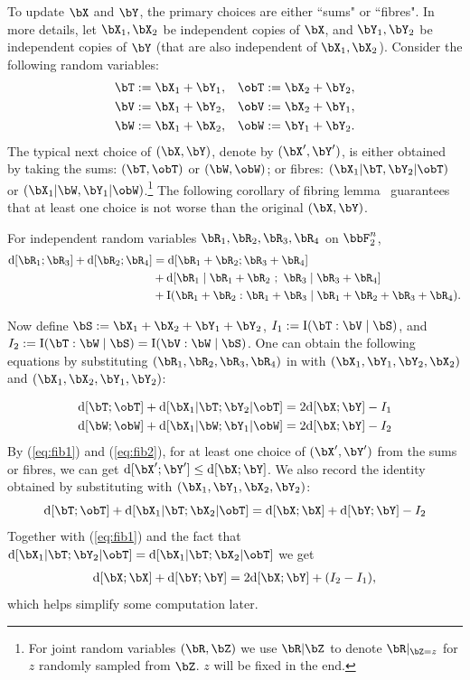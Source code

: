 \documentclass{article}
\DeclarePairedDelimiter{\paren}{(}{)}
\DeclarePairedDelimiter{\sqpar}{[}{]}
\newcommand{\info}{\mathrm{I}\paren}
\newcommand{\Ruz}{\mathrm{d}\sqpar}
\begin{document}
To update $\bX$ and $\bY$, the primary choices are either ``sums" or ``fibres". In more details, let $\bX_1,\bX_2$ be independent copies of $\bX$, and $\bY_1,\bY_2$ be independent copies of $\bY$ (that are also independent of $\bX_1,\bX_2$). Consider the following random variables:
\begin{align*}
\bT&:=\bX_1+\bY_1, & \obT&:=\bX_2+\bY_2,\\
\bV&:=\bX_1+\bY_2, & \obV&:=\bX_2+\bY_1,\\
\bW&:=\bX_1+\bX_2, & \obW&:=\bY_1+\bY_2.\\
\end{align*}
The typical next choice of $(\bX,\bY)$, denote by $(\bX',\bY')$, is either obtained by taking the sums: $(\bT,\obT)$ or $(\bW,\obW)$; or fibres: $(\bX_1|\bT, \bY_2|\obT)$ or $(\bX_1|\bW, \bY_1|\obW)$.\footnote{For joint random variables $(\bR,\bZ)$ we use $\bR|\bZ$ to denote $\bR|_{\bZ=z}$ for $z$ randomly sampled from $\bZ$. $z$ will be fixed in the end.} The following corollary of fibring lemma~\cite{GMT23,GGMT23} guarantees that at least one choice is not worse than the original $(\bX,\bY)$.
\begin{lemma}\label{lemma:fibring}
For independent random variables $\bR_1,\bR_2,\bR_3,\bR_4$ on $\bbF_2^n$,
\begin{align*}
\Ruz{\bR_1 ; \bR_3}+\Ruz{\bR_2 ; \bR_4}&=\Ruz{\bR_1+\bR_2 ; \bR_3+\bR_4}\\
&+\Ruz{\bR_1\mid\bR_1+\bR_2 \,\,; \,\,\bR_3\mid\bR_3+\bR_4}\\
&+\info{\bR_1+\bR_2:\bR_1+\bR_3\mid\bR_1+\bR_2+\bR_3+\bR_4}.
\end{align*}
\end{lemma}
\noindent
Now define $\bS:=\bX_1+\bX_2+\bY_1+\bY_2$, $I_1:=\info{\bT:\bV\mid\bS}$, and $I_2:=\info{\bT:\bW\mid\bS}=\info{\bV:\bW\mid\bS}$. One can obtain the following equations by substituting $(\bR_1,\bR_2,\bR_3,\bR_4)$ in  with $(\bX_1,\bY_1,\bY_2,\bX_2)$ and $(\bX_1,\bX_2,\bY_1,\bY_2)$:

\begin{align}
\Ruz{\bT;\obT}+\Ruz{\bX_1|\bT;\bY_2|\obT}&=2\Ruz{\bX;\bY}-I_1\label{eq:fib1}\\
\Ruz{\bW;\obW}+\Ruz{\bX_1|\bW;\bY_1|\obW}&=2\Ruz{\bX;\bY}-I_2\label{eq:fib2}
\end{align}
By (\ref{eq:fib1}) and (\ref{eq:fib2}), for at least one choice of $(\bX',\bY')$ from the sums or fibres, we can get $\Ruz{\bX';\bY'}\le\Ruz{\bX;\bY}$. 
We also record the identity obtained by substituting with $(\bX_1,\bY_1,\bX_2,\bY_2)$:
$$\Ruz{\bT;\obT}+\Ruz{\bX_1|\bT;\bX_2|\obT}=\Ruz{\bX;\bX}+\Ruz{\bY;\bY}-I_2$$
Together with (\ref{eq:fib1}) and the fact that $\Ruz{\bX_1|\bT;\bY_2|\obT}=\Ruz{\bX_1|\bT;\bX_2|\obT}$ we get 
\begin{align}\label{eq:xxyy}
\Ruz{\bX;\bX}+\Ruz{\bY;\bY}=2\Ruz{\bX;\bY}+(I_2-I_1),
\end{align}
which helps simplify some computation later. 
\end{document}

